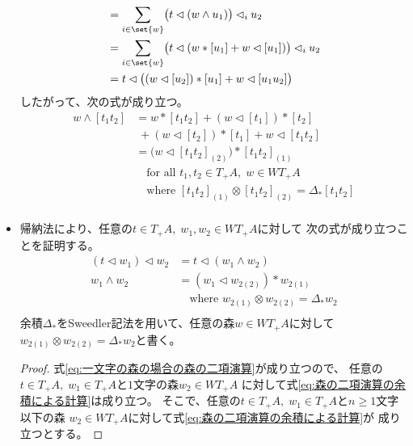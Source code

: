 \begin{itemize}
\begin{equation*}
\begin{split}
				&= \sum_{i\in \set{w}}\bigl(t\lhd (w\land u_1)\bigr)\lhd_i u_2 \\
				&= \sum_{i\in \set{w}}\bigl(t\lhd (w*[u_1]+w\lhd[u_1])\bigr)\lhd_i u_2 \\
				&= t\lhd \bigl((w\lhd[u_2])*[u_1]+w\lhd[u_1u_2]\bigr) \\
			\end{split}\end{equation*} %
			したがって、次の式が成り立つ。
			\begin{equation*}\begin{split} %
				w\land[t_1t_2] &=w*[t_1t_2]+(w\lhd[t_1])*[t_2] \\
					&\;+ (w\lhd[t_2])*[t_1]+w\lhd[t_1t_2] \\
					&= \bigl(w\lhd[t_1t_2]_{(2)}\bigr)*[t_1t_2]_{(1)} \\
					&\quad\text{for all }t_1,t_2\in T_+A,\;w\in WT_+A \\
					&\quad\text{where }[t_1t_2]_{(1)}\otimes[t_1t_2]_{(2)}=\Delta_*[t_1t_2] \\
			\end{split}\end{equation*} %
			\item 帰納法により、任意の$t\in T_+A,\;w_1,w_2\in WT_+A$に対して
			次の式が成り立つことを証明する。
			\begin{equation}\label{eq:森の二項演算の余積による計算}\begin{split} %
				(t\lhd w_1)\lhd w_2 &= t\lhd (w_1\land w_2) \\
				w_1\land w_2 &= (w_1\lhd w_{2(2)})* w_{2(1)} \\
				&\quad\text{where }w_{2(1)}\otimes w_{2(2)}=\Delta_*w_2 \\
			\end{split}\end{equation} %
			余積$\Delta_*$をSweedler記法を用いて、任意の森$w\in WT_+A$に対して
			$w_{2(1)}\otimes w_{2(2)}=\Delta_*w_2$と書く。
			\begin{proof} %
				式\eqref{eq:一文字の森の場合の森の二項演算}が成り立つので、
				任意の$t\in T_+A,\;w_1\in T_+A$と$1$文字の森$w_2\in WT_+A$
				に対して式\eqref{eq:森の二項演算の余積による計算}は成り立つ。
				そこで、任意の$t\in T_+A,\;w_1\in T_+A$と$n\ge 1$文字以下の森
				$w_2\in WT_+A$に対して式\eqref{eq:森の二項演算の余積による計算}が
				成り立つとする。


\end{proof}
\end{itemize}
